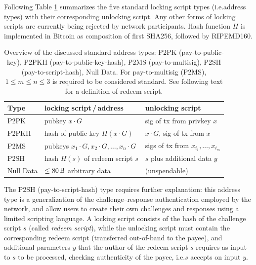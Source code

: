 \documentclass[a4paper,11pt,titlepage]{scrbook}
\begin{document}
Following Table \ref{table:script-types} summarizes the five standard locking script types (i.e.\@ address types) with their corresponding unlocking script. Any other forms of locking scripts are currently being rejected by network participants.
Hash function $H$ is implemented in Bitcoin as composition of first SHA256, followed by RIPEMD160.

\begin{table}
    \renewcommand{\arraystretch}{1.2}
    \centering
    \begin{tabular}{lll}
        \toprule
        \textbf{Type} & \textbf{locking script\,/\,address} & \textbf{unlocking script} \\
        \midrule
        P2PK & pubkey $x\cdot G$ & sig of tx from privkey $x$ \\
        P2PKH & hash of public key $H(x\cdot G)$ & $x\cdot G$, sig of tx from $x$ \\
        P2MS & pubkeys $x_1{\cdot} G, x_2{\cdot} G, \dots, x_n{\cdot} G$ & sigs of tx from $x_{i_1}, \dots, x_{i_m}$ \\
        P2SH & hash $H(s)$ of redeem script $s$ & $s$ plus additional data $y$ \\
        Null Data & $\leq \SI{80}{\byte}$ arbitrary data & (unspendable)\\
        \bottomrule
    \end{tabular}
    \caption[Overview of the discussed standard address types]{Overview of the discussed standard address types: P2PK (pay-to-public-key), P2PKH (pay-to-public-key-hash), P2MS (pay-to-multisig), P2SH (pay-to-script-hash), Null Data. For pay-to-multisig (P2MS), $1\leq m\leq n\leq 3$ is required to be considered standard. See following text for a definition of redeem script.}
    \label{table:script-types}
\end{table}

The P2SH (pay-to-script-hash) type requires further explanation: this address type is a generalization of the challenge–response authentication employed by the network, and allow users to create their own challenges and responses using a limited scripting language.
A locking script consists of the hash of the challenge script $s$ (called \emph{redeem script}), while the unlocking script must contain the corresponding redeem script (transferred out-of-band to the payee), and additional parameters $y$ that the author of the redeem script $s$ requires as input to $s$ to be processed, checking authenticity of the payee, i.e.\@ $s$ accepts on input $y$.
\end{document}

